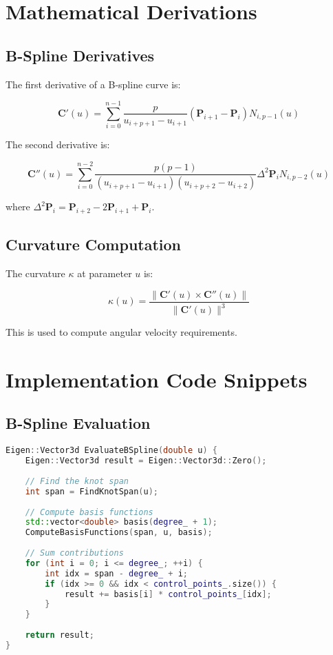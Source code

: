 \documentclass[11pt]{article}
\begin{document}
\appendix

\section{Mathematical Derivations}

\subsection{B-Spline Derivatives}

The first derivative of a B-spline curve is:

\begin{equation}
\mathbf{C}'(u) = \sum_{i=0}^{n-1} \frac{p}{u_{i+p+1} - u_{i+1}} (\mathbf{P}_{i+1} - \mathbf{P}_i) N_{i,p-1}(u)
\end{equation}

The second derivative is:

\begin{equation}
\mathbf{C}''(u) = \sum_{i=0}^{n-2} \frac{p(p-1)}{(u_{i+p+1} - u_{i+1})(u_{i+p+2} - u_{i+2})} \Delta^2 \mathbf{P}_i N_{i,p-2}(u)
\end{equation}

where $\Delta^2 \mathbf{P}_i = \mathbf{P}_{i+2} - 2\mathbf{P}_{i+1} + \mathbf{P}_i$.

\subsection{Curvature Computation}

The curvature $\kappa$ at parameter $u$ is:

\begin{equation}
\kappa(u) = \frac{\|\mathbf{C}'(u) \times \mathbf{C}''(u)\|}{\|\mathbf{C}'(u)\|^3}
\end{equation}

This is used to compute angular velocity requirements.

\section{Implementation Code Snippets}

\subsection{B-Spline Evaluation}

\begin{lstlisting}[language=C++, caption=Complete B-Spline Evaluation]
Eigen::Vector3d EvaluateBSpline(double u) {
    Eigen::Vector3d result = Eigen::Vector3d::Zero();
    
    // Find the knot span
    int span = FindKnotSpan(u);
    
    // Compute basis functions
    std::vector<double> basis(degree_ + 1);
    ComputeBasisFunctions(span, u, basis);
    
    // Sum contributions
    for (int i = 0; i <= degree_; ++i) {
        int idx = span - degree_ + i;
        if (idx >= 0 && idx < control_points_.size()) {
            result += basis[i] * control_points_[idx];
        }
    }
    
    return result;
}
\end{lstlisting}
\end{document}
